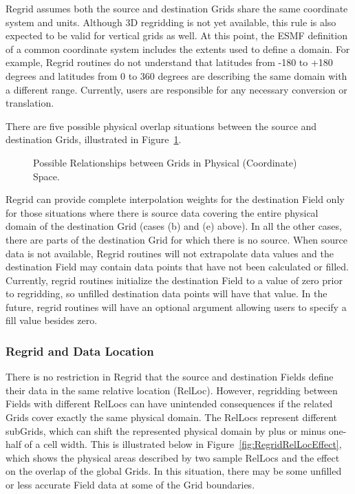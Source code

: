 Regrid assumes both the source and destination Grids share the same coordinate
system and units.  Although 3D regridding is not yet available, this rule is
also expected to be valid for vertical grids as well.  At this point, the ESMF
definition of a common coordinate system includes the extents used to define
a domain.  For example, Regrid routines do not understand that latitudes from
-180 to +180 degrees and latitudes from 0 to 360 degrees are describing the
same domain with a different range.  Currently, users are responsible for any
necessary conversion or translation.  

There are five possible physical overlap situations between the source and
destination Grids, illustrated in Figure~\ref{fig:RegridGridOverlap}.

\begin{center}
\begin{figure}
\caption{Possible Relationships between Grids in Physical (Coordinate) Space. }
\label{fig:RegridGridOverlap}
\end{figure}
\end{center}

Regrid can provide complete interpolation weights for the destination Field
only for those situations where there is source data covering the entire physical
domain of the destination Grid (cases (b) and (e) above).  In all the other
cases, there are parts of the destination Grid for which there is no source. 
When source data is not available, Regrid routines will not extrapolate data
values and the destination Field may contain data points that have not been
calculated or filled.  Currently, regrid routines initialize the destination
Field to a value of zero prior to regridding, so unfilled destination data points
will have that value.  In the future, regrid routines will have an optional
argument allowing users to specify a fill value besides zero.  


\subsubsection{Regrid and Data Location}

There is no restriction in Regrid that the source and destination Fields
define their data in the same relative location (RelLoc).  However, regridding
between Fields with different RelLocs can have unintended consequences if the
related Grids cover exactly the same physical domain.  The RelLocs represent
different subGrids, which can shift the represented physical domain by plus or
minus one-half of a cell width.  This is illustrated below in
Figure~\ref{fig:RegridRelLocEffect}, which shows the physical areas described by
two sample RelLocs and the effect on the overlap of the global Grids.  In this
situation, there may be some unfilled or less accurate Field data at some of the
Grid boundaries.

